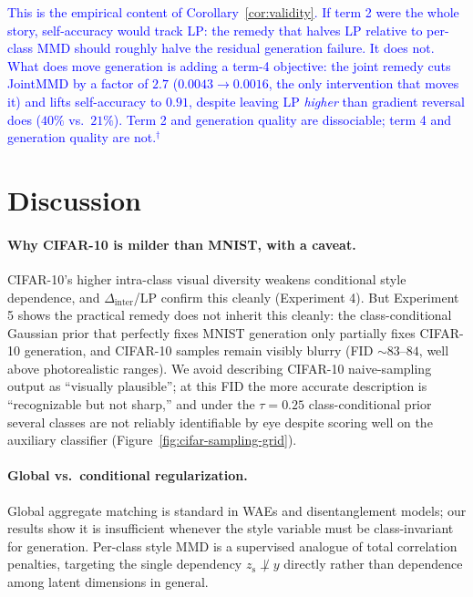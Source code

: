 \documentclass[10pt,letterpaper]{article}
\newcommand{\zs}{z_{\mathrm{s}}}
\newcommand{\pj}[1]{\textcolor{blue}{#1$^{\dagger}$}}
\begin{document}
\pj{This is the empirical content of Corollary~\ref{cor:validity}. If term 2
were the whole story, self-accuracy would track LP: the remedy that halves
LP relative to per-class MMD should roughly halve the residual generation
failure. It does not. What does move generation is adding a term-4
objective: the joint remedy cuts JointMMD by a factor of $2.7$ ($0.0043
\to0.0016$, the only intervention that moves it) and lifts self-accuracy to
$0.91$, despite leaving LP \emph{higher} than gradient reversal does
($40\%$ vs.\ $21\%$). Term 2 and generation quality are dissociable; term 4
and generation quality are not.}

\section{Discussion}
\label{sec:discussion}

\paragraph{Why CIFAR-10 is milder than MNIST, with a caveat.}
CIFAR-10's higher intra-class visual diversity weakens conditional style
dependence, and $\Delta_{\mathrm{inter}}$/LP confirm this cleanly
(Experiment 4). But Experiment 5 shows the practical remedy does not
inherit this cleanly: the class-conditional Gaussian prior that perfectly
fixes MNIST generation only partially fixes CIFAR-10 generation, and
CIFAR-10 samples remain visibly blurry (FID $\sim\!83$--$84$, well above
photorealistic ranges). We avoid describing CIFAR-10 naive-sampling output
as ``visually plausible''; at this FID the more accurate description is
``recognizable but not sharp,'' and under the $\tau{=}0.25$
class-conditional prior several classes are not reliably identifiable by
eye despite scoring well on the auxiliary classifier
(Figure~\ref{fig:cifar-sampling-grid}).

\paragraph{Global vs.\ conditional regularization.}
Global aggregate matching is standard in WAEs and disentanglement models;
our results show it is insufficient whenever the style variable must be
class-invariant for generation. Per-class style MMD is a supervised
analogue of total correlation penalties, targeting the single dependency
$\zs\not\perp y$ directly rather than dependence among latent dimensions in
general.
\end{document}
